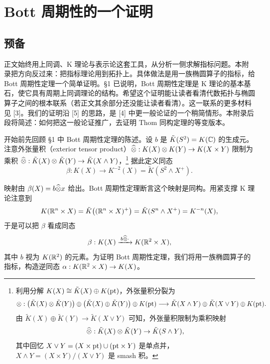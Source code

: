 \section{Bott 周期性的一个证明}
\subsection{预备}

正文始终用上同调、K 理论与表示论这套工具，从分析一侧求解指标问题。本附录把方向反过来：把指标理论用到拓扑上。具体做法是用一族椭圆算子的指标，给 Bott 周期性定理一个简单证明。§1 已说明，Bott 周期性定理是 K 理论的基本基石，使它具有周期上同调理论的结构。希望这个证明能让读者看清代数拓扑与椭圆算子之间的根本联系（若正文其余部分还没能让读者看清）。这一联系的更多材料见 [3]。我们的证明沿 [5] 的思路，是 [4] 中更一般论证的一个稍简情形。本附录后段将简述：如何把这一般论证推广，去证明 Thom 同构定理的等变版本。

开始前先回顾 §1 中 Bott 周期性定理的陈述。设 $b$ 是 $\tilde K(S^2)=K(\mathbb{C})$ 的生成元。注意外张量积（exterior tensor product）$\widehat{\otimes}:K(X)\otimes K(Y)\to K(X\times Y)$ 限制为乘积 $\widehat{\otimes}:\tilde K(X)\otimes\tilde K(Y)\to\tilde K(X\wedge Y)$，\footnote{利用分解 $K(X)\cong\tilde K(X)\oplus K(\mathrm{pt})$，外张量积分裂为
\[
\otimes:\bigl(\tilde K(X)\otimes\tilde K(Y)\bigr)\oplus\bigl(\tilde K(X)\oplus\tilde K(Y)\bigr)\oplus K(\mathrm{pt})\longrightarrow\tilde K(X\wedge Y)\oplus\tilde K(X\vee Y)\oplus K(\mathrm{pt}).
\]
由 $\tilde K(X)\oplus\tilde K(Y)\to\tilde K(X\vee Y)$ 可知，外张量积限制为乘积映射
\[
\widehat{\otimes}:\tilde K(X)\otimes\tilde K(Y)\to\tilde K(S\wedge Y),
\]
其中回忆 $X\vee Y=(X\times\mathrm{pt})\cup(\mathrm{pt}\times Y)$ 是单点并，$X\wedge Y=(X\times Y)/(X\vee Y)$ 是 smash 积。} 据此定义同态
\[
\beta:K(X)\to K^{-2}(X)=\tilde K(S^2\wedge X^+).
\]


映射由 $\beta(X)=b\widehat{\otimes} x$ 给出。Bott 周期性定理断言这个映射是同构。用紧支撑 K 理论注意到
\[
K(\mathbb{R}^n\times X)=\tilde K\bigl((\mathbb{R}^n\times X)^+\bigr)=\tilde K(S^n\wedge X^+)=K^{-n}(X),
\]
于是可以把 $\beta$ 看成同态
\[
\beta:K(X)\xrightarrow{\,b\widehat{\otimes}\cdot\,}K(\mathbb{R}^2\times X),
\]
其中 $b$ 视为 $K(\mathbb{R}^2)$ 的元素。为证明 Bott 周期性定理，我们将用一族椭圆算子的指标，构造逆同态 $\alpha:K(\mathbb{R}^2\times X)\to K(X)$。

